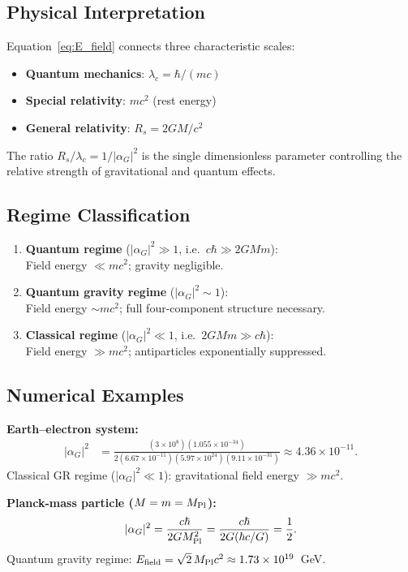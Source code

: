 \documentclass[11pt,a4paper]{article}
\theoremstyle{definition}
\theoremstyle{remark}
\begin{document}
	\subsection{Physical Interpretation}
	
	Equation~\eqref{eq:E_field} connects three characteristic scales:
	\begin{itemize}
		\item \textbf{Quantum mechanics}: $\lambda_c=\hbar/(mc)$
		\item \textbf{Special relativity}: $mc^2$ (rest energy)
		\item \textbf{General relativity}: $R_s=2GM/c^2$
	\end{itemize}
	The ratio $R_s/\lambda_c = 1/|\alpha_G|^2$ is the single dimensionless parameter controlling the relative strength of gravitational and quantum effects.
	
	\subsection{Regime Classification}
	
	\begin{enumerate}
		\item \textbf{Quantum regime} ($|\alpha_G|^2\gg1$, i.e.\ $c\hbar\gg2GMm$):\\
		Field energy $\ll mc^2$; gravity negligible.
		\item \textbf{Quantum gravity regime} ($|\alpha_G|^2\sim1$):\\
		Field energy $\sim mc^2$; full four-component structure necessary.
		\item \textbf{Classical regime} ($|\alpha_G|^2\ll1$, i.e.\ $2GMm\gg c\hbar$):\\
		Field energy $\gg mc^2$; antiparticles exponentially suppressed.
	\end{enumerate}
	
	\subsection{Numerical Examples}
	
	\textbf{Earth--electron system:}
	\begin{align}
		|\alpha_G|^2 &= \frac{(3\times10^8)(1.055\times10^{-34})}{2(6.67\times10^{-11})(5.97\times10^{24})(9.11\times10^{-31})} \approx 4.36\times10^{-11}.
	\end{align}
	Classical GR regime ($|\alpha_G|^2\ll1$): gravitational field energy $\gg mc^2$.
	
	\textbf{Planck-mass particle ($M=m=M_{\rm Pl}$):}
	\begin{equation}
		|\alpha_G|^2 = \frac{c\hbar}{2GM_{\rm Pl}^2} = \frac{c\hbar}{2G(\hbar c/G)} = \frac{1}{2}.
	\end{equation}
	Quantum gravity regime: $E_{\mathrm{field}} = \sqrt{2}\,M_{\rm Pl}c^2\approx 1.73\times10^{19}$~GeV.
	
\end{document}
